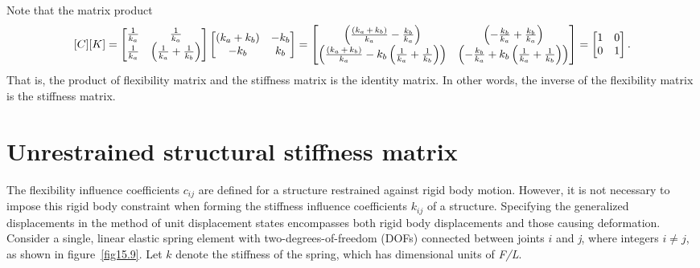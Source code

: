 \documentclass{AeroStructure-ERJohnson}
\begin{document}
\begin{example}
Note that the matrix product
\[
[C][K]=\left[\begin{array}{@{}cc@{}}\frac{1}{k_{a}} & \frac{1}{k_{a}}\\ \frac{1}{k_{a}} & \left(\frac{1}{k_{a}}+\frac{1}{k_{b}}\right)\end{array}\right]
\left[\begin{array}{@{}cc@{}}(k_{a}+k_{b}) & -k_{b} \\-k_{b} & k_{b}\end{array}\right]=\left[\begin{array}{@{}cc@{}}\left(\frac{\left(k_{a}\,+\, k_{b}\right)}{k_{a}}-\frac{k_{b}}{k_{a}}\right) & \left(-\frac{k_{b}}{k_{a}}+\frac{k_{b}}{k_{a}}\right)\\ \left(\frac{\left(k_{a}\,+\, k_{b}\right)}{k_{a}}-k_{b}\left(\frac{1}{k_{a}}+\frac{1}{k_{b}}\right)\right) & \left(-\frac{k_{b}}{k_{a}}+k_{b}\left(\frac{1}{k_{a}}+\frac{1}{k_{b}}\right)\right)\end{array}\right]=\left[\begin{array}{@{}ll@{}}1 & 0 \\0 & 1\end{array}\right].
\]
That is, the product of flexibility matrix and the stiffness matrix is the identity matrix. In other words, the inverse of the flexibility matrix is the stiffness matrix.
\end{example}
\setcounter{equation}{2}

\section{Unrestrained structural stiffness matrix}\label{sec15.2}

The flexibility influence coefficients $c_{i j}$ are defined for a structure restrained against rigid body motion. However, it is not necessary to impose this rigid body constraint when forming the stiffness influence coefficients $k_{i j}$ of a structure. Specifying the generalized displacements in the method of unit displacement states encompasses both rigid body displacements and those causing deformation. Consider a single, linear elastic spring element with two-degrees-of-freedom (DOFs) connected between joints $i$ and \textit{j}, where integers $i \neq j$, as shown in figure~\ref{fig15.9}. Let $k$ denote the stiffness of the spring, which has dimensional units of \textit{F/L}.

{\def\thefigure{15.9}
}
\end{document}
